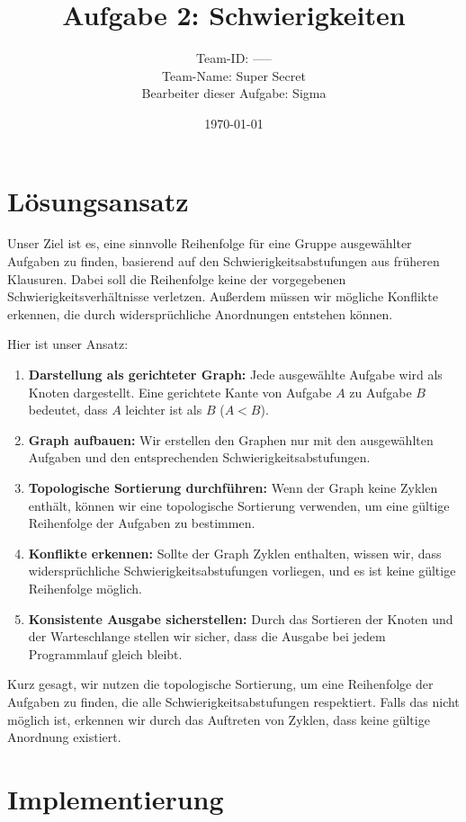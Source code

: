 \documentclass{article}
\title{Aufgabe 2: Schwierigkeiten}
\author{Team-ID: ----- \\ Team-Name: Super Secret \\ Bearbeiter dieser Aufgabe: Sigma}
\date{\today}
\begin{document}
\maketitle

\tableofcontents

\section{Lösungsansatz}

Unser Ziel ist es, eine sinnvolle Reihenfolge für eine Gruppe ausgewählter Aufgaben zu finden, basierend auf den Schwierigkeitsabstufungen aus früheren Klausuren. Dabei soll die Reihenfolge keine der vorgegebenen Schwierigkeitsverhältnisse verletzen. Außerdem müssen wir mögliche Konflikte erkennen, die durch widersprüchliche Anordnungen entstehen können.

Hier ist unser Ansatz:

\begin{enumerate}
    \item \textbf{Darstellung als gerichteter Graph:} Jede ausgewählte Aufgabe wird als Knoten dargestellt. Eine gerichtete Kante von Aufgabe \( A \) zu Aufgabe \( B \) bedeutet, dass \( A \) leichter ist als \( B \) (\( A < B \)).
    \item \textbf{Graph aufbauen:} Wir erstellen den Graphen nur mit den ausgewählten Aufgaben und den entsprechenden Schwierigkeitsabstufungen.
    \item \textbf{Topologische Sortierung durchführen:} Wenn der Graph keine Zyklen enthält, können wir eine topologische Sortierung verwenden, um eine gültige Reihenfolge der Aufgaben zu bestimmen.
    \item \textbf{Konflikte erkennen:} Sollte der Graph Zyklen enthalten, wissen wir, dass widersprüchliche Schwierigkeitsabstufungen vorliegen, und es ist keine gültige Reihenfolge möglich.
    \item \textbf{Konsistente Ausgabe sicherstellen:} Durch das Sortieren der Knoten und der Warteschlange stellen wir sicher, dass die Ausgabe bei jedem Programmlauf gleich bleibt.
\end{enumerate}

Kurz gesagt, wir nutzen die topologische Sortierung, um eine Reihenfolge der Aufgaben zu finden, die alle Schwierigkeitsabstufungen respektiert. Falls das nicht möglich ist, erkennen wir durch das Auftreten von Zyklen, dass keine gültige Anordnung existiert.

\section{Implementierung}
\end{document}
